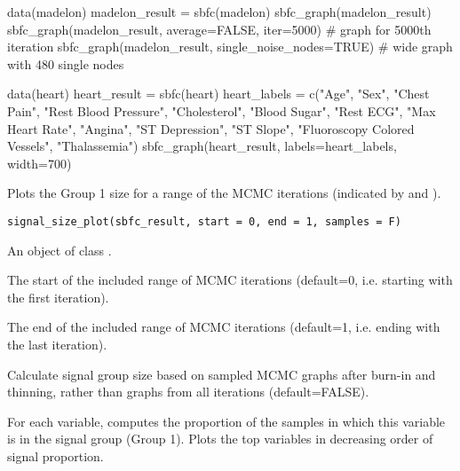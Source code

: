 \documentclass[a4paper]{book}
\begin{document}
%
\begin{Examples}
\begin{ExampleCode}
data(madelon)
madelon_result = sbfc(madelon)
sbfc_graph(madelon_result) 
sbfc_graph(madelon_result, average=FALSE, iter=5000) # graph for 5000th iteration
sbfc_graph(madelon_result, single_noise_nodes=TRUE) # wide graph with 480 single nodes

data(heart)
heart_result = sbfc(heart)
heart_labels = c("Age", "Sex", "Chest Pain", "Rest Blood Pressure", "Cholesterol", 
"Blood Sugar", "Rest ECG", "Max Heart Rate", "Angina", "ST Depression", "ST Slope",
"Fluoroscopy Colored Vessels", "Thalassemia")
sbfc_graph(heart_result, labels=heart_labels, width=700)
\end{ExampleCode}
\end{Examples}
%
\begin{Description}\relax
Plots the Group 1 size for a range of the MCMC iterations (indicated by  and ).
\end{Description}
%
\begin{Usage}
\begin{verbatim}
signal_size_plot(sbfc_result, start = 0, end = 1, samples = F)
\end{verbatim}
\end{Usage}
%
\begin{Arguments}
\begin{ldescription}
\item[\code{sbfc\_result}] An object of class .

\item[\code{start}] The start of the included range of MCMC iterations (default=0, i.e. starting with the first iteration).

\item[\code{end}] The end of the included range of MCMC iterations (default=1, i.e. ending with the last iteration).

\item[\code{samples}] Calculate signal group size based on sampled MCMC graphs after burn-in and thinning,
rather than graphs from all iterations (default=FALSE).
\end{ldescription}
\end{Arguments}
%
\begin{Description}\relax
For each variable, computes the proportion of the samples in which this variable is in the signal group (Group 1). 
Plots the top  variables in decreasing order of signal proportion.
\end{Description}
\end{document}
